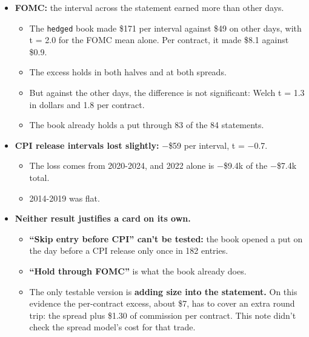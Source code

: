 \documentclass{article}
\begin{document}
\begin{itemize}

\item \textbf{FOMC:} the interval across the statement earned more than other days.

\begin{itemize}

\item The \texttt{hedged} book made \$171 per interval against \$49 on other days, with t = 2.0 for the FOMC mean alone. Per contract, it made \$8.1 against \$0.9.

\item The excess holds in both halves and at both spreads.

\item But against the other days, the difference is not significant: Welch t = 1.3 in dollars and 1.8 per contract.

\item The book already holds a put through 83 of the 84 statements.

\end{itemize}

\item \textbf{CPI release intervals lost slightly:} \ensuremath{-}\$59 per interval, t = \ensuremath{-}0.7.

\begin{itemize}

\item The loss comes from 2020-2024, and 2022 alone is \ensuremath{-}\$9.4k of the \ensuremath{-}\$7.4k total.

\item 2014-2019 was flat.

\end{itemize}

\item \textbf{Neither result justifies a card on its own.}

\begin{itemize}

\item \textbf{``Skip entry before CPI'' can't be tested:} the book opened a put on the day before a CPI release only once in 182 entries.

\item \textbf{``Hold through FOMC''} is what the book already does.

\item The only testable version is \textbf{adding size into the statement.} On this evidence the per-contract excess, about \$7, has to cover an extra round trip: the spread plus \$1.30 of commission per contract. This note didn't check the spread model's cost for that trade.

\end{itemize}

\end{itemize}
\end{document}
